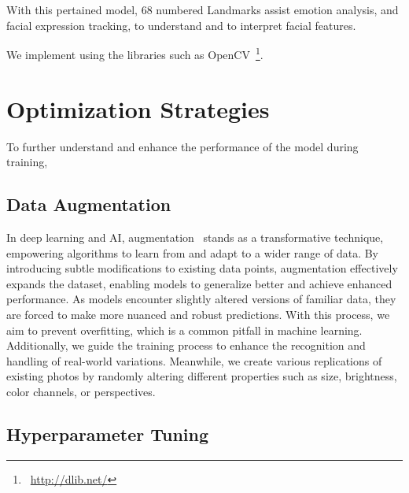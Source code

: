 With this pertained model, 68 numbered Landmarks assist emotion analysis, and facial expression tracking, to understand and to interpret facial features.

We implement using the libraries such as OpenCV~\footnote{~\url{http://dlib.net/}}. %


\section{Optimization Strategies}
\label{sec:optim}

To further understand and enhance the performance of the model during training, 

\subsection{Data Augmentation}
\label{sec:optim:aug}

In deep learning and AI, 
augmentation~\cite{augment} stands as a transformative technique, 
empowering algorithms to learn from and adapt to a wider range of data. 
By introducing subtle modifications to existing data points, 
augmentation effectively expands the dataset, 
enabling models to generalize better and achieve enhanced performance. 
As models encounter slightly altered versions of familiar data, 
they are forced to make more nuanced and robust predictions. 
With this process, we aim to prevent overfitting, which is a common pitfall in machine learning. 
Additionally, we guide the training process to enhance the recognition and handling of real-world variations.
Meanwhile, we create various replications of existing photos by randomly altering different properties such as size, brightness, color channels, or perspectives.

\subsection{Hyperparameter Tuning}
\label{sec:optim:tuning}

